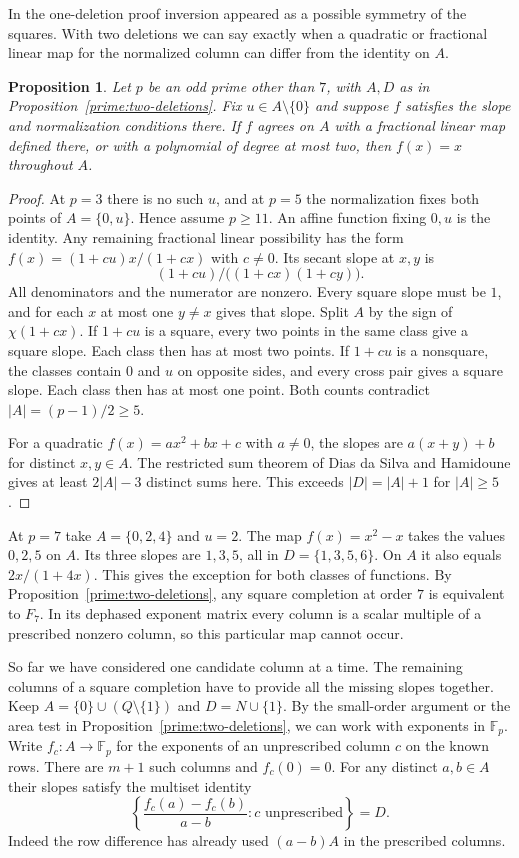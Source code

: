 \documentclass[11pt,a4paper]{article}
\newtheorem{proposition}[theorem]{Proposition}
\numberwithin{equation}{section}
\begin{document}
In the one-deletion proof inversion appeared as a possible symmetry of the squares. With two deletions we can say exactly when a quadratic or fractional linear map for the normalized column can differ from the identity on $A$.

\begin{proposition}\label{prime:low-degree-column}
Let $p$ be an odd prime other than $7$, with $A,D$ as in Proposition~\ref{prime:two-deletions}. Fix $u\in A\setminus\{0\}$ and suppose $f$ satisfies the slope and normalization conditions there. If $f$ agrees on $A$ with a fractional linear map defined there, or with a polynomial of degree at most two, then $f(x)=x$ throughout $A$.
\end{proposition}
\begin{proof}
At $p=3$ there is no such $u$, and at $p=5$ the normalization fixes both points of $A=\{0,u\}$. Hence assume $p\ge11$. An affine function fixing $0,u$ is the identity. Any remaining fractional linear possibility has the form $f(x)=(1+cu)x/(1+cx)$ with $c\ne0$. Its secant slope at $x,y$ is
$$(1+cu)/\big((1+cx)(1+cy)\big).$$
All denominators and the numerator are nonzero. Every square slope must be $1$, and for each $x$ at most one $y\ne x$ gives that slope. Split $A$ by the sign of $\chi(1+cx)$. If $1+cu$ is a square, every two points in the same class give a square slope. Each class then has at most two points. If $1+cu$ is a nonsquare, the classes contain $0$ and $u$ on opposite sides, and every cross pair gives a square slope. Each class then has at most one point. Both counts contradict $|A|=(p-1)/2\ge5$.

For a quadratic $f(x)=ax^2+bx+c$ with $a\ne0$, the slopes are $a(x+y)+b$ for distinct $x,y\in A$. The restricted sum theorem of Dias da Silva and Hamidoune \cite{dsh} gives at least $2|A|-3$ distinct sums here. This exceeds $|D|=|A|+1$ for $|A|\ge5$.
\end{proof}

At $p=7$ take $A=\{0,2,4\}$ and $u=2$. The map $f(x)=x^2-x$ takes the values $0,2,5$ on $A$. Its three slopes are $1,3,5$, all in $D=\{1,3,5,6\}$. On $A$ it also equals $2x/(1+4x)$. This gives the exception for both classes of functions. By Proposition~\ref{prime:two-deletions}, any square completion at order $7$ is equivalent to $F_7$. In its dephased exponent matrix every column is a scalar multiple of a prescribed nonzero column, so this particular map cannot occur.

So far we have considered one candidate column at a time. The remaining columns of a square completion have to provide all the missing slopes together. Keep $A=\{0\}\cup(Q\setminus\{1\})$ and $D=N\cup\{1\}$. By the small-order argument or the area test in Proposition~\ref{prime:two-deletions}, we can work with exponents in $\mathbb F_p$. Write $f_c:A\to\mathbb F_p$ for the exponents of an unprescribed column $c$ on the known rows. There are $m+1$ such columns and $f_c(0)=0$. For any distinct $a,b\in A$ their slopes satisfy the multiset identity
\[
 \left\{\frac{f_c(a)-f_c(b)}{a-b}:c\text{ unprescribed}\right\}=D.
\]
Indeed the row difference has already used $(a-b)A$ in the prescribed columns.
\end{document}
